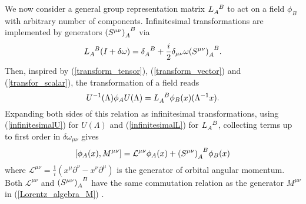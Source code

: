 We now consider a general group representation matrix $\tend{L}{A}{B}$  to act on a field $\phi_B$ with arbitrary number of components. Infinitesimal transformations are implemented by generators $\tend{(S^{\mu\nu})}{A}{B}$ via
\begin{equation}
    \tend{L}{A}{B}(I+\delta\omega)=\tend{\delta}{A}{B}+\frac{i}{2}\delta_{\mu\nu}\omega\tend{(S^{\mu\nu})}{A}{B}.
\end{equation}
Then, inspired by (\ref{transform_tensor}), (\ref{transform_vector}) and (\ref{transfor_scalar}), the transformation of a field reads
\begin{equation}
    U^{-1}(\Lambda)\phi_A U(\Lambda)=\tend{L}{A}{B}\phi_B(x)(\Lambda^{-1}x).
    \label{infinitesimalL}
\end{equation}
Expanding both sides of this relation as infinitesimal transformations, using (\ref{infinitesimalU}) for $U(\Lambda)$ and  (\ref{infinitesimalL}) for $\tend{L}{A}{B}$, collecting terms up to first order in $\delta\omega_{\mu\nu}$ gives
\begin{equation}
    \comm{\phi_A(x)}{M^{\mu\nu}}=\mathcal{L}^{\mu\nu}\phi_A(x)+\tend{(S^{\mu\nu})}{A}{B}\phi_B(x)
    \label{commuta_generator}
\end{equation}
where $\mathcal{L}^{\mu\nu}=\frac{1}{i}(x^\mu\partial^\nu-x^\nu\partial^\mu)$ is the generator of orbital angular momentum. Both $\mathcal{L}^{\mu\nu}$ and $\tend{(S^{\mu\nu})}{A}{B}$ have the same commutation relation as the generator $M^{\mu\nu}$ in (\ref{Lorentz_algebra_M}) \cite{srednicki2007quantum, maggiore2005modern}.

